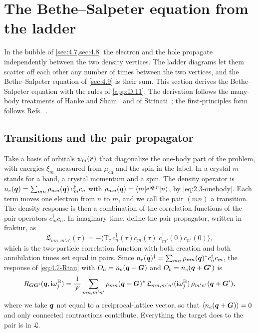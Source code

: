 \section{The Bethe--Salpeter equation from the ladder}\label{app:D.12}

In the bubble of \cref{sec:4.7,sec:4.8} the electron and the hole propagate independently between the two density vertices. The ladder diagrams let them scatter off each other any number of times between the two vertices, and the Bethe--Salpeter equation of \cref{sec:4.9} is their sum. This section derives the Bethe--Salpeter equation with the rules of \cref{app:D.11}. The derivation follows the many-body treatments of Hanke and Sham~\cite{hanke1980many} and of Strinati~\cite{strinati1988application}; the first-principles form follows Refs.~\cite{albrecht1998ab,rohlfing2000electron,onida2002electronic}.

\subsection*{Transitions and the pair propagator}

Take a basis of orbitals $\psi_m(\bm{r})$ that diagonalize the one-body part of the problem, with energies $\xi_m$ measured from $\mu_{\mathrm{ch}}$ and the spin in the label. In a crystal $m$ stands for a band, a crystal momentum and a spin. The density operator is $n_e(\bm{q}) = \sum_{mn}\rho_{mn}(\bm{q})\,c^\dagger_mc_n$ with $\rho_{mn}(\bm{q}) = \langle m|\mathrm{e}^{\mathrm{i}\bm{q}\cdot\bm{r}}|n\rangle$, by \cref{eq:2.3-onebody}. Each term moves one electron from $n$ to $m$, and we call the pair $(mn)$ a transition. The density response is then a combination of the correlation functions of the pair operators $c^\dagger_mc_n$. In imaginary time, define the pair propagator, written in fraktur, as
\begin{equation}
  \mathfrak{L}_{mn,m'n'}(\tau) = -\bigl\langle\mathrm{T}_\tau\,c^\dagger_n(\tau)c_m(\tau)\;c^\dagger_{m'}(0)c_{n'}(0)\bigr\rangle ,
  \label{eq:D.12-L}
\end{equation}
which is the two-particle correlation function with both creation and both annihilation times set equal in pairs. Since $n_e(\bm{q})^\dagger = \sum_{mn}\rho_{mn}(\bm{q})^*c^\dagger_nc_m$, the response of \cref{eq:4.7-Rtau} with $O_a = n_e(\bm{q}+\bm{G})$ and $O_b = n_e(\bm{q}+\bm{G}')$ is
\begin{equation}
  R_{\bm{G}\bm{G}'}(\bm{q},\mathrm{i}\omega^{\mathrm{B}}_j) = \frac1{\mathscr{V}}\sum_{mn,m'n'}\rho_{mn}(\bm{q}+\bm{G})^*\,\mathfrak{L}_{mn,m'n'}(\mathrm{i}\omega^{\mathrm{B}}_j)\,\rho_{m'n'}(\bm{q}+\bm{G}') ,
  \label{eq:D.12-R}
\end{equation}
where we take $\bm{q}$ not equal to a reciprocal-lattice vector, so that $\langle n_e(\bm{q}+\bm{G})\rangle = 0$ and only connected contractions contribute. Everything the target does to the pair is in $\mathfrak{L}$.

